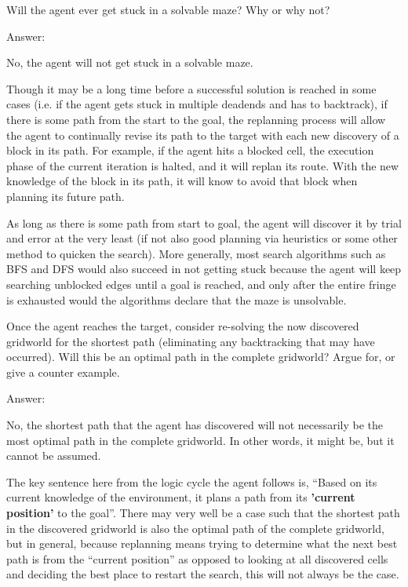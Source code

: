 \documentclass{homeworg}
\begin{document}
\newpage
\exercise*
Will the agent ever get stuck in a solvable maze? Why or why not?

Answer:

No, the agent will not get stuck in a solvable maze. 

Though it may be a long time before a successful solution is reached in some cases (i.e. if the agent gets stuck in multiple deadends and has to backtrack), if there is some path from the start to the goal, the replanning process will allow the agent to continually revise its path to the target with each new discovery of a block in its path. For example, if the agent hits a blocked cell, the execution phase of the current iteration is halted, and it will replan its route. With the new knowledge of the block in its path, it will know to avoid that block when planning its future path. 

As long as there is some path from start to goal, the agent will discover it by trial and error at the very least (if not also good planning via heuristics or some other method to quicken the search). More generally, most search algorithms such as BFS and DFS would also succeed in not getting stuck because the agent will keep searching unblocked edges until a goal is reached, and only after the entire fringe is exhausted would the algorithms declare that the maze is unsolvable.

\newpage
\exercise*
Once the agent reaches the target, consider re-solving the now discovered gridworld for the shortest path (eliminating any backtracking that may have occurred). Will this be an optimal path in the complete gridworld? Argue for, or give a counter example.

Answer:

No, the shortest path that the agent has discovered will not necessarily be the most optimal path in the complete gridworld. In other words, it might be, but it cannot be assumed.

The key sentence here from the logic cycle the agent follows is, “Based on its current knowledge of the environment, it plans a path from its \textbf{'current position'} to the goal”. There may very well be a case such that the shortest path in the discovered gridworld is also the optimal path of the complete gridworld, but in general, because replanning means trying to determine what the next best path is from the “current position” as opposed to looking at all discovered cells and deciding the best place to restart the search, this will not always be the case.
\end{document}
